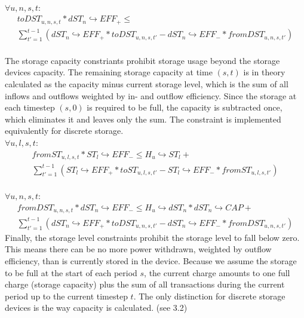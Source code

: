 \documentclass[
	11pt,								%
	DIV10,								%
	a4paper,         					%
	oneside,							%
	headheight=20pt,					%
	footheight=20pt,					%
    parskip=full,						%
    listof=totoc,						%
	bibliography=totoc,					%
	index=totoc,						%
]{scrartcl}
\begin{document}
	\\
	$\forall u,n,s,t$:
	\begin{equation}
		\begin{split}
		toDST_{u,n,s,t} * dST_n \hookrightarrow EFF_{+} \leq \\
		\sum_{t'=1}^{t-1}(dST_n \hookrightarrow EFF_{+} * toDST_{u,n,s,t'} - dST_n \hookrightarrow EFF_{-} * fromDST_{u,n,s,t'})
		\end{split}
	\end{equation}
	\\
	The storage capacity constriants prohibit storage usage beyond the storage devices capacity. The remaining storage capacity at time $(s,t)$ is in theory calculated as the capacity minus current storage level, which is the sum of all inflows and outflows weighted by in- and outflow efficiency. Since the storage at each timestep $(s,0)$ is required to be full, the capacity is subtracted once, which eliminates it and leaves only the sum. The constraint is implemented equivalently for discrete storage. 
	\\
	$\forall u,l,s,t$:
	\begin{equation}
	\begin{split}
		fromST_{u,l,s,t} * ST_l \hookrightarrow EFF_{-} \leq H_u \hookrightarrow ST_l +\\
		\sum_{t'=1}^{t-1}(ST_l \hookrightarrow EFF_{+} * toST_{u,l,s,t'} - ST_l \hookrightarrow EFF_{-} * fromST_{u,l,s,t'})
		\end{split}
	\end{equation}
	\\
	$\forall u,n,s,t$:
	\begin{equation}
	\begin{split}
		fromDST_{u,n,s,t} * dST_n \hookrightarrow EFF_{-} \leq H_u \hookrightarrow dST_n * dST_n \hookrightarrow CAP +  \\
		\sum_{t'=1}^{t-1}(dST_n \hookrightarrow EFF_{+} * toDST_{u,n,s,t'} - dST_n \hookrightarrow EFF_{-} * fromDST_{u,n,s,t'})
	\end{split}
	\end{equation}
	Finally, the storage level constraints prohibit the storage level to fall below zero. This means there can be no more power withdrawn, weighted by outflow efficiency, than is currently stored in the device. Because we assume the storage to be full at the start of each period $s$, the current charge amounts to one full charge (storage capacity) plus the sum of all transactions during the current period up to the current timestep $t$. The only distinction for discrete storage devices is the way capacity is calculated. (see 3.2)
\end{document}
